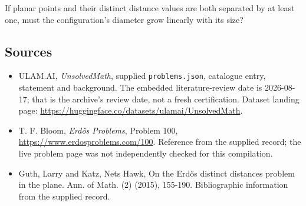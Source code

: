 \documentclass[11pt,a4paper]{article}
\begin{document}
If planar points and their distinct distance values are both separated by at least one, must the configuration's diameter grow linearly with its size?

\subsection{Sources}

{\small

\begin{itemize}

\item[\hypertarget{source:statement:1}{S1}] ULAM.AI, \emph{UnsolvedMath}, supplied \texttt{problems.json}, catalogue entry, statement and background. The embedded literature-review date is 2026-08-17; that is the archive’s review date, not a fresh certification. Dataset landing page: \url{https://huggingface.co/datasets/ulamai/UnsolvedMath}.

\item[\hypertarget{source:statement:2}{S2}] T. F. Bloom, \emph{Erdős Problems}, Problem 100, \url{https://www.erdosproblems.com/100}. Reference from the supplied record; the live problem page was not independently checked for this compilation.

\item[\hypertarget{source:statement:3}{S3}] Guth, Larry and Katz, Nets Hawk, On the Erd\H{o}s distinct distances problem in the plane. Ann. of Math. (2) (2015), 155-190. Bibliographic information from the supplied record.

\end{itemize}

}

\label{end:statement}
\end{document}
